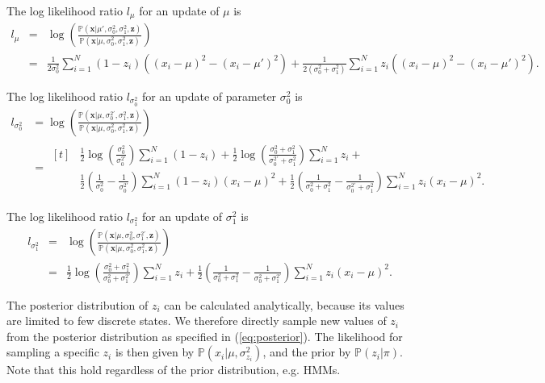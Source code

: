 \documentclass[a4paper,11pt]{article}
\def\p{\mathbb{P}}
\begin{document}
The log likelihood ratio $l_{\mu}$ for an update of $\mu$ is
\begin{eqnarray*}
 l_{\mu} &=& \log \left(\frac{\p(\boldsymbol x | \mu', \sigma_0^2, \sigma_1^2, \boldsymbol z)}{\p(\boldsymbol x | \mu, \sigma_0^2, \sigma_1^2, \boldsymbol z)} \right)\\
 &=& \frac{1}{2\sigma_0^2} \sum_{i=1}^N (1-z_i) \left( (x_{i} - \mu)^2 - (x_{i} - \mu')^2 \right) + \frac{1}{2\left(\sigma_0^2 + \sigma_1^2\right)} \sum_{i=1}^N z_i \left( (x_{i} - \mu)^2 - (x_{i} - \mu')^2 \right).
\end{eqnarray*}

The log likelihood ratio $l_{\sigma_0^2}$ for an update of parameter $\sigma_0^2$ is
\begin{align*}
 l_{\sigma_0^2} &= \log \left(\frac{\p(\boldsymbol x | \mu, \sigma_0^{2'}, \sigma_1^2, \boldsymbol z)}{\p(\boldsymbol x | \mu, \sigma_0^2, \sigma_1^2, \boldsymbol z)} \right) \\
 &= \begin{aligned}[t]
 & \frac{1}{2}\log\left(\frac{\sigma_0^2}{\sigma_0^{2'}}\right)\sum_{i=1}^N (1-z_i) + \frac{1}{2} \log\left(\frac{\sigma_0^2+\sigma_1^2}{\sigma_0^{2'}+\sigma_1^2}\right) \sum_{i=1}^N z_i  + \\
 &          \frac{1}{2}\left(\frac{1}{\sigma_0^2} - \frac{1}{\sigma_0^{2'}}\right)\sum_{i=1}^N(1-z_i)(x_{i} - \mu)^2 + \frac{1}{2}\left(\frac{1}{\sigma_0^2+\sigma_1^2} - \frac{1}{\sigma_0^{2'}+\sigma_1^2}\right)\sum_{i=1}^N z_i(x_{i} - \mu)^2.
 \end{aligned}
\end{align*}

The log likelihood ratio $l_{\sigma_1^2}$ for an update of $\sigma_1^2$ is
\begin{eqnarray*}
 l_{\sigma_1^2} &=& \log \left(\frac{\p(\boldsymbol x | \mu, \sigma_0^2, \sigma_1^{2'}, \boldsymbol z)}{\p(\boldsymbol x | \mu, \sigma_0^2, \sigma_1^2, \boldsymbol z)} \right) \\
 &=& \frac{1}{2}\log\left(\frac{\sigma_0^2+\sigma_1^2}{\sigma_0^2+\sigma_1^{2'}}\right) \sum_{i=1}^N z_i + \frac{1}{2}\left(\frac{1}{\sigma_0^2+\sigma_1^2} - \frac{1}{\sigma_0^2+\sigma_1^{2'}}\right)\sum_{i=1}^Nz_i(x_{i} - \mu)^2.
\end{eqnarray*}

The posterior distribution of $z_i$ can be calculated analytically, because its values are limited to few discrete states. We therefore directly sample new values of $z_i$ from the posterior distribution as specified in (\ref{eq:posterior}). The likelihood for sampling a specific $z_i$ is then given by $\p(x_i | \mu, \sigma^2_{z_i})$, and the prior by $\p(z_i | \pi )$. Note that this hold regardless of the prior distribution, e.g. HMMs.
\end{document}
